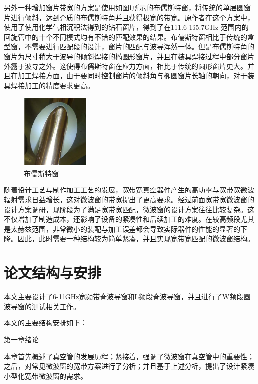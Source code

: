 \documentclass[master]{thesis-uestc}
\begin{document}
另外一种增加窗片带宽的方案是使用如图\ref{fig:布儒斯特窗}所示的布儒斯特窗，将传统的单层圆窗片进行倾斜，达到介质的布儒斯特角并且获得极宽的带宽。原作者在这个方案中，使用了使用化学气相沉积法得到的钻石窗片，得到了在111.6-165.7GHz 范围内的回旋管中的十个不同模式均有不错的匹配效果的结果。布儒斯特窗相比于传统的盒型窗，不需要进行匹配段的设计，窗片的匹配与波导浑然一体。但是布儒斯特角的窗片为尺寸稍大于波导的倾斜焊接的椭圆形窗片，并且在装具焊接过程中部分窗片外露于波导之外。这使得布儒斯特窗在应力方面，相比于传统的圆形窗片更大。并且在加工焊接方面，由于要同时控制窗片的倾斜角与椭圆窗片长轴的朝向，对于装具焊接加工的精度要求更高。
\begin{figure}[!htb]
    \centering
    \includegraphics[width=0.3\textwidth]{pic/chapter1/布儒斯特窗.png}
    \caption{布儒斯特窗}
    \label{fig:布儒斯特窗}
\end{figure}

随着设计工艺与制作加工工艺的发展，宽带宽真空器件产生的高功率与宽带宽微波辐射需求日益增长，这对微波窗的带宽提出了更高要求。经过前面宽带宽微波窗的设计方案调研，现阶段为了满足宽带宽匹配，微波窗的设计方案往往比较复杂。这不仅增加了制造成本，还影响了设备的紧凑性和后续加工的难度。在较高频段尤其是太赫兹范围，非常微小的装配与加工误差都会导致实际器件的性能的显著的下降。因此，此时需要一种结构较为简单紧凑，并且实现宽带宽匹配的微波窗结构。

\section{论文结构与安排}
本文主要设计了6-11GHz宽频带脊波导窗和L频段脊波导窗，并且进行了W频段圆波导窗的测试相关工作。

本文的主要结构安排如下：

第一章\hspace{6pt}绪论

本章首先概述了真空管的发展历程；紧接着，强调了微波窗在真空管中的重要性；之后，对常见微波窗的宽带方案进行了分析；并且基于上述分析，提出了设计紧凑小型化宽带微波窗的需求。
\end{document}

